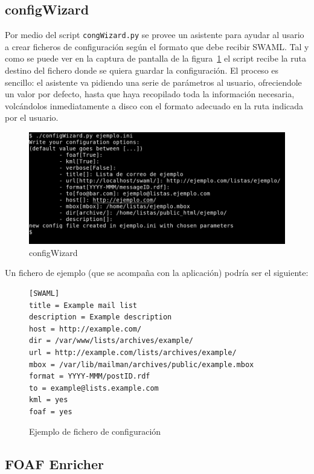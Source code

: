 \subsection*{configWizard}

Por medio del script \texttt{congWizard.py} se provee un asistente para
ayudar al usario a crear ficheros de configuración según el formato
que debe recibir SWAML. Tal y como se puede ver en la captura de pantalla
de la figura~\ref{fig:configWizard} el script recibe la ruta destino del 
fichero donde se quiera guardar la configuración. El proceso es sencillo: 
el asistente va pidiendo una serie de parámetros al usuario, ofreciendole
un valor por defecto, hasta que haya recopilado toda la información necesaria,
volcándolos inmediatamente a disco con el formato adecuado en la ruta 
indicada por el usuario.

\begin{figure}[H]
	\centering
	\includegraphics[width=14cm]{images/screenshots/configWizard.png}
	\caption{configWizard}
	\label{fig:configWizard}
\end{figure}

Un fichero de ejemplo (que se acompaña con la aplicación) podría ser el
siguiente:

\begin{figure}[H]
\begin{lstlisting}
[SWAML]
title = Example mail list
description = Example description
host = http://example.com/
dir = /var/www/lists/archives/example/
url = http://example.com/lists/archives/example/
mbox = /var/lib/mailman/archives/public/example.mbox
format = YYYY-MMM/postID.rdf
to = example@lists.example.com
kml = yes
foaf = yes
\end{lstlisting}
\caption{Ejemplo de fichero de configuración}
\label{fig:ejemplo-config}
\end{figure}

\subsection*{FOAF Enricher}

